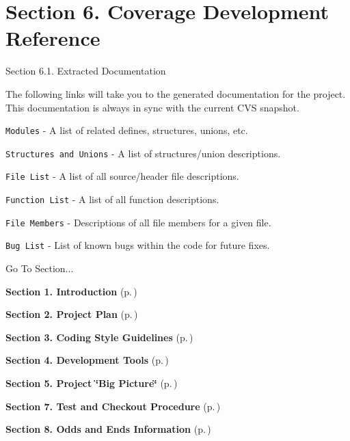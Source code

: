 \section{Section 6.  Coverage Development Reference}\label{page_code_details}
 \begin{Desc}
\item[Section 6.1.  Extracted Documentation]\par
 The following links will take you to the generated documentation for the project. This documentation is always in sync with the current CVS snapshot.

\begin{CompactItemize}
\item 
{\tt Modules} - A list of related defines, structures, unions, etc.\item 
{\tt Structures and Unions} - A list of structures/union descriptions.\item 
{\tt File List} - A list of all source/header file descriptions.\item 
{\tt Function List} - A list of all function descriptions.\item 
{\tt File Members} - Descriptions of all file members for a given file.\item 
{\tt Bug List} - List of known bugs within the code for future fixes.\end{CompactItemize}
\end{Desc}


\begin{Desc}
\item[Go To Section...]\par
\begin{CompactItemize}
\item 
{\bf Section 1.  Introduction} {\rm (p.\,\pageref{page_intro})}\item 
{\bf Section 2.  Project Plan} {\rm (p.\,\pageref{page_project_plan})}\item 
{\bf Section 3.  Coding Style Guidelines} {\rm (p.\,\pageref{page_code_style})}\item 
{\bf Section 4.  Development Tools} {\rm (p.\,\pageref{page_tools})}\item 
{\bf Section 5.  Project \char`\"{}Big Picture\char`\"{}} {\rm (p.\,\pageref{page_big_picture})}\item 
{\bf Section 7.  Test and Checkout Procedure} {\rm (p.\,\pageref{page_testing})}\item 
{\bf Section 8.  Odds and Ends Information} {\rm (p.\,\pageref{page_misc})}\end{CompactItemize}
\end{Desc}
